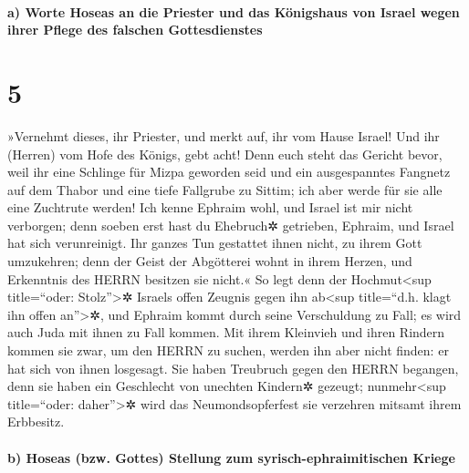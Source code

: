 \hypertarget{a-worte-hoseas-an-die-priester-und-das-kuxf6nigshaus-von-israel-wegen-ihrer-pflege-des-falschen-gottesdienstes}{%
\paragraph{a) Worte Hoseas an die Priester und das Königshaus von Israel
wegen ihrer Pflege des falschen
Gottesdienstes}\label{a-worte-hoseas-an-die-priester-und-das-kuxf6nigshaus-von-israel-wegen-ihrer-pflege-des-falschen-gottesdienstes}}

\hypertarget{section-4}{%
\section{5}\label{section-4}}

 »Vernehmt dieses, ihr Priester, und merkt auf, ihr vom
Hause Israel! Und ihr (Herren) vom Hofe des Königs, gebt acht! Denn euch
steht das Gericht bevor, weil ihr eine Schlinge für Mizpa geworden seid
und ein ausgespanntes Fangnetz auf dem Thabor  und eine
tiefe Fallgrube zu Sittim; ich aber werde für sie alle eine Zuchtrute
werden!  Ich kenne Ephraim wohl, und Israel ist mir nicht
verborgen; denn soeben erst hast du Ehebruch✲ getrieben, Ephraim, und
Israel hat sich verunreinigt.  Ihr ganzes Tun gestattet
ihnen nicht, zu ihrem Gott umzukehren; denn der Geist der Abgötterei
wohnt in ihrem Herzen, und Erkenntnis des HERRN besitzen sie nicht.«
 So legt denn der Hochmut\textless sup title=``oder:
Stolz''\textgreater✲ Israels offen Zeugnis gegen ihn ab\textless sup
title=``d.h. klagt ihn offen an''\textgreater✲, und Ephraim kommt durch
seine Verschuldung zu Fall; es wird auch Juda mit ihnen zu Fall kommen.
 Mit ihrem Kleinvieh und ihren Rindern kommen sie zwar, um
den HERRN zu suchen, werden ihn aber nicht finden: er hat sich von ihnen
losgesagt.  Sie haben Treubruch gegen den HERRN begangen,
denn sie haben ein Geschlecht von unechten Kindern✲ gezeugt;
nunmehr\textless sup title=``oder: daher''\textgreater✲ wird das
Neumondsopferfest sie verzehren mitsamt ihrem Erbbesitz.

\hypertarget{b-hoseas-bzw.-gottes-stellung-zum-syrisch-ephraimitischen-kriege}{%
\paragraph{b) Hoseas (bzw. Gottes) Stellung zum syrisch-ephraimitischen
Kriege}\label{b-hoseas-bzw.-gottes-stellung-zum-syrisch-ephraimitischen-kriege}}

